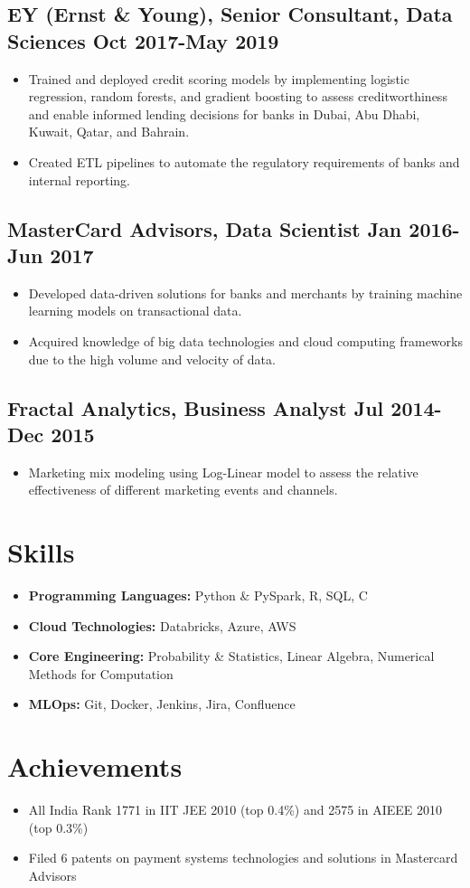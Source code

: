 \documentclass[a4paper,10pt]{article}
\begin{document}
\subsection*{EY (Ernst \& Young), Senior Consultant, Data Sciences \hfill Oct 2017-May 2019}
\begin{itemize}[leftmargin=*]
    \item Trained and deployed credit scoring models by implementing logistic regression, random forests, and gradient boosting to assess creditworthiness and enable informed lending decisions for banks in Dubai, Abu Dhabi, Kuwait, Qatar, and Bahrain.
    \item Created ETL pipelines to automate the regulatory requirements of banks and internal reporting.
\end{itemize}

\subsection*{MasterCard Advisors, Data Scientist \hfill Jan 2016-Jun 2017}
\begin{itemize}[leftmargin=*]
    \item Developed data-driven solutions for banks and merchants by training machine learning models on transactional data.
    \item Acquired knowledge of big data technologies and cloud computing frameworks due to the high volume and velocity of data.
\end{itemize}

\subsection*{Fractal Analytics, Business Analyst \hfill Jul 2014-Dec 2015}
\begin{itemize}[leftmargin=*]
    \item Marketing mix modeling using Log-Linear model to assess the relative effectiveness of different marketing events and channels.
\end{itemize}

\section*{Skills}
\begin{itemize}[leftmargin=*]
    \item \textbf{Programming Languages:} Python \& PySpark, R, SQL, C
    \item \textbf{Cloud Technologies:} Databricks, Azure, AWS
    \item \textbf{Core Engineering:} Probability \& Statistics, Linear Algebra, Numerical Methods for Computation
    \item \textbf{MLOps:} Git, Docker, Jenkins, Jira, Confluence
\end{itemize}

\section*{Achievements}
\begin{itemize}[leftmargin=*]
    \item All India Rank 1771 in IIT JEE 2010 (top 0.4\%) and 2575 in AIEEE 2010 (top 0.3\%)
    \item Filed 6 patents on payment systems technologies and solutions in Mastercard Advisors
\end{itemize}
\end{document}
